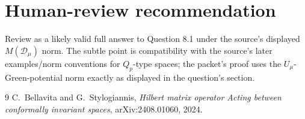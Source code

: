 \documentclass[11pt]{article}
\begin{document}
\section*{Human-review recommendation}

Review as a likely valid full answer to Question 8.1 under the source's
displayed \(M(\mathcal D_\mu)\) norm.  The subtle point is compatibility with
the source's later examples/norm conventions for \(Q_p\)-type spaces; the
packet's proof uses the \(U_\mu\)-Green-potential norm exactly as displayed in
the question's section.

\begin{thebibliography}{9}
C.~Bellavita and G.~Stylogiannis,
\emph{Hilbert matrix operator Acting between conformally invariant spaces},
arXiv:2408.01060, 2024.
\end{thebibliography}
\end{document}
